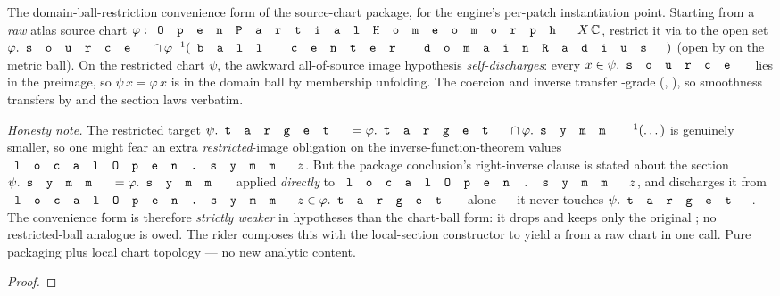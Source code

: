 \begin{lemma}
\label{lem:montel-raw-source-chart-package}
The domain-ball-restriction convenience form of the source-chart package, for the
engine's per-patch instantiation point. Starting from a \emph{raw} atlas source
chart \(\varphi:\code{OpenPartialHomeomorph}\,X\,\C\), restrict it via
 to the open set
\(\varphi.\code{source}\cap\varphi^{-1}(\code{ball}\,\code{center}\,\code{domainRadius})\)
(open by  on the metric ball). On the restricted
chart \(\psi\), the awkward all-of-source image hypothesis 
\emph{self-discharges}: every \(x\in\psi.\code{source}\) lies in the preimage, so
\(\psi\,x=\varphi\,x\) is in the domain ball by membership unfolding. The
coercion and inverse transfer -grade (,
), so smoothness transfers by 
and the section laws verbatim.

\emph{Honesty note.} The restricted target \(\psi.\code{target}
=\varphi.\code{target}\cap\varphi.\code{symm}^{-1}(\dots)\) is genuinely smaller,
so one might fear an extra \emph{restricted}-image obligation on the
inverse-function-theorem values \(\code{localOpen.symm}\,z\). But the package
conclusion's right-inverse clause is stated about the section
\(\psi.\code{symm}=\varphi.\code{symm}\) applied \emph{directly} to
\(\code{localOpen.symm}\,z\), and 
discharges it from \(\code{localOpen.symm}\,z\in\varphi.\code{target}\) alone —
it never touches \(\psi.\code{target}\). The convenience form is therefore
\emph{strictly weaker} in hypotheses than the chart-ball form: it drops
 and keeps only the original ; no restricted-ball
analogue is owed. The rider
 composes this with the
local-section constructor to yield a  from a raw chart
in one call. Pure packaging plus local chart topology — no new analytic content.
\leanok
\end{lemma}
\begin{proof}\leanok\end{proof}

